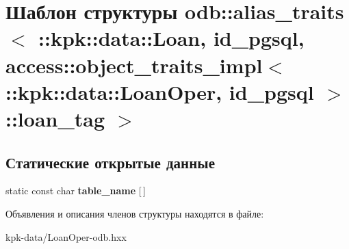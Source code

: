 \hypertarget{structodb_1_1alias__traits_3_01_01_01_01_01_01_01_01_01_01_01_01_01_01_01_01_01_01_1_1kpk_1_1dat25d73432b438681bf6843f75e337b287}{}\section{Шаблон структуры odb\+:\+:alias\+\_\+traits$<$ \+:\+:kpk\+:\+:data\+:\+:Loan, id\+\_\+pgsql, access\+:\+:object\+\_\+traits\+\_\+impl$<$ \+:\+:kpk\+:\+:data\+:\+:Loan\+Oper, id\+\_\+pgsql $>$\+:\+:loan\+\_\+tag $>$}
\label{structodb_1_1alias__traits_3_01_01_01_01_01_01_01_01_01_01_01_01_01_01_01_01_01_01_1_1kpk_1_1dat25d73432b438681bf6843f75e337b287}
\subsection*{Статические открытые данные}
\begin{DoxyCompactItemize}
\item 
static const char {\bfseries table\+\_\+name} \mbox{[}$\,$\mbox{]}\hypertarget{structodb_1_1alias__traits_3_01_01_01_01_01_01_01_01_01_01_01_01_01_01_01_01_01_01_1_1kpk_1_1dat25d73432b438681bf6843f75e337b287_a5aba38b717dd324ced69e5cde3596a1a}{}\label{structodb_1_1alias__traits_3_01_01_01_01_01_01_01_01_01_01_01_01_01_01_01_01_01_01_1_1kpk_1_1dat25d73432b438681bf6843f75e337b287_a5aba38b717dd324ced69e5cde3596a1a}

\end{DoxyCompactItemize}


Объявления и описания членов структуры находятся в файле\+:\begin{DoxyCompactItemize}
\item 
kpk-\/data/Loan\+Oper-\/odb.\+hxx\end{DoxyCompactItemize}

